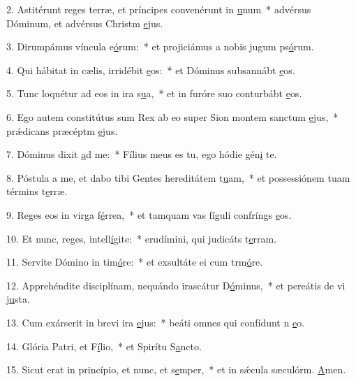 2. Astitérunt reges terræ, et príncipes convenérunt in \uline{u}num~* advérsus Dóminum, et advérsus Christm \uline{e}jus.\par 
3. Dirumpámus víncula e\uline{ó}rum:~* et projiciámus a nobis jugum ps\uline{ó}rum.\par 
4. Qui hábitat in cælis, irridébit \uline{e}os:~* et Dóminus subsannábt \uline{e}os.\par 
5. Tunc loquétur ad eos in ira s\uline{u}a,~* et in furóre suo conturbábt \uline{e}os.\par 
6. Ego autem constitútus sum Rex ab eo super Sion montem sanctum \uline{e}jus,~* prǽdicans præcéptm \uline{e}jus.\par 
7. Dóminus dixit \uline{a}d me:~* Fílius meus es tu, ego hódie gén\uline{i} te.\par 
8. Póstula a me, et dabo tibi Gentes hereditátem t\uline{u}am,~* et possessiónem tuam términs t\uline{e}rræ.\par 
9. Reges eos in virga f\uline{é}rrea,~* et tamquam vas fíguli confríngs \uline{e}os.\par 
10. Et nunc, reges, intell\uline{í}gite:~* erudímini, qui judicáts t\uline{e}rram.\par 
11. Servíte Dómino in tim\uline{ó}re:~* et exsultáte ei cum trm\uline{ó}re.\par 
12. Apprehéndite disciplínam, nequándo irascátur D\uline{ó}minus,~* et pereátis de vi j\uline{u}sta.\par 
13. Cum exárserit in brevi ira \uline{e}jus:~* beáti omnes qui confídunt n \uline{e}o.\par 
14. Glória Patri, et F\uline{í}lio,~* et Spirítu S\uline{a}ncto.\par 
15. Sicut erat in princípio, et nunc, et s\uline{e}mper,~* et in sǽcula sæculórm. \uline{A}men.\par 
